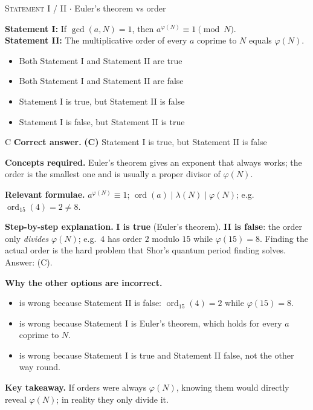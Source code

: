 \documentclass[11pt,a4paper]{article}
\newcommand{\optlabel}[1]{\textbf{(#1)}}
\newcommand{\correctlabel}[1]{\textcolor{okgreen}{\textbf{(#1)}\,\ding{51}}}
\newenvironment{qitem}[1]{\begin{list}{}{\setlength{\leftmargin}{3.3em}\setlength{\labelwidth}{3.1em}%
  \setlength{\labelsep}{0.2em}\setlength{\topsep}{3pt}\setlength{\parsep}{3pt}}\item[\textbf{Q.#1}\hfill]}{\end{list}}
\newcommand{\qsep}{\par\vspace{2pt}{\color{black!15}\hrule}\vspace{4pt}}
\newcommand{\qmeta}[2]{{\footnotesize\color{black!60}\textsc{#1} \;$\cdot$\; #2}\par}
\begin{document}
\begin{qitem}{18}
\qmeta{Statement I / II}{Euler's theorem vs order}
\textbf{Statement I:} If $\gcd(a, N) = 1$, then $a^{\varphi(N)} \equiv 1 \pmod N$.\\[1mm]
\textbf{Statement II:} The multiplicative order of every $a$ coprime to $N$ equals $\varphi(N)$.
\begin{itemize}[leftmargin=2.6em, labelsep=0.4em, itemsep=2pt, topsep=3pt]
\item[\optlabel{A}] Both Statement I and Statement II are true
\item[\optlabel{B}] Both Statement I and Statement II are false
\item[\correctlabel{C}] Statement I is true, but Statement II is false
\item[\optlabel{D}] Statement I is false, but Statement II is true
\end{itemize}
\end{qitem}
\begin{solbox}{C}
\textbf{\color{brand}Correct answer.} \textcolor{okgreen}{\textbf{(C)}} Statement I is true, but Statement II is false

\textbf{\color{brand}Concepts required.} Euler's theorem gives an exponent that always works; the order is the smallest one and is usually a proper divisor of $\varphi(N)$.

\textbf{\color{brand}Relevant formulae.} $a^{\varphi(N)} \equiv 1$; $\operatorname{ord}(a) \mid \lambda(N) \mid \varphi(N)$; e.g.\ $\operatorname{ord}_{15}(4) = 2 \ne 8$.

\textbf{\color{brand}Step-by-step explanation.} \textbf{I is true} (Euler's theorem). \textbf{II is false}: the order only \emph{divides} $\varphi(N)$; e.g.\ $4$ has order $2$ modulo $15$ while
$\varphi(15) = 8$. Finding the actual order is the hard problem that Shor's quantum period finding solves. Answer: (C).

\textbf{\color{brand}Why the other options are incorrect.}
\begin{itemize}[leftmargin=2.4em, itemsep=1pt, topsep=2pt]
\item[\textbf{(A)}] is wrong because Statement II is false: $\operatorname{ord}_{15}(4) = 2$ while $\varphi(15) = 8$.
\item[\textbf{(B)}] is wrong because Statement I is Euler's theorem, which holds for every $a$ coprime to $N$.
\item[\textbf{(D)}] is wrong because Statement I is true and Statement II false, not the other way round.
\end{itemize}
\textbf{\color{brand}Key takeaway.} If orders were always $\varphi(N)$, knowing them would directly reveal $\varphi(N)$; in reality they only divide it.
\end{solbox}
\qsep
\end{document}
